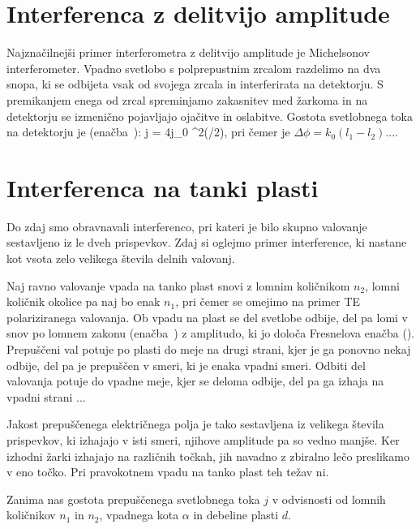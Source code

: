 \section{Interferenca z delitvijo amplitude}
Najznačilnejši primer interferometra z delitvijo amplitude je Michelsonov interferometer.
Vpadno svetlobo s polprepustnim zrcalom razdelimo na dva snopa, ki se odbijeta vsak od 
svojega zrcala in interferirata na detektorju. S premikanjem enega od zrcal spreminjamo
zakasnitev med žarkoma in na detektorju se izmenično pojavljajo ojačitve in oslabitve.
Gostota svetlobnega toka na detektorju je (enačba~):
\beq
j = 4j_0 \cos^2(\Delta \phi/2),
\label{eq:06_24}
\eeq
pri čemer je $\Delta \phi = k_0(l_1-l_2)$....


\section{Interferenca na tanki plasti}
Do zdaj smo obravnavali interferenco, pri kateri je bilo skupno valovanje sestavljeno iz le 
dveh prispevkov. Zdaj si oglejmo primer interference, ki nastane kot vsota zelo velikega 
števila delnih valovanj. 

Naj ravno valovanje vpada na tanko plast snovi z lomnim količnikom $n_2$, lomni količnik 
okolice pa naj bo enak $n_1$, pri čemer se omejimo na primer TE polariziranega valovanja.
Ob vpadu na plast se del svetlobe odbije, del pa lomi v snov po lomnem zakonu (enačba~) 
z amplitudo, ki jo določa Fresnelova enačba (). Prepuščeni val potuje po plasti do meje
na drugi strani, kjer je ga ponovno nekaj odbije, del pa je prepuščen v smeri, ki 
je enaka vpadni smeri. Odbiti del valovanja potuje 
do vpadne meje, kjer se deloma odbije, del pa ga izhaja na vpadni strani ... 

Jakost prepuščenega električnega polja je tako sestavljena iz velikega števila prispevkov, ki 
izhajajo v isti smeri, njihove amplitude pa so vedno manjše. Ker izhodni žarki 
izhajajo na različnih točkah, jih navadno z zbiralno lečo preslikamo v eno točko. Pri pravokotnem
vpadu na tanko plast teh težav ni. 

Zanima nas gostota prepuščenega svetlobnega toka $j$ v odvisnosti od 
lomnih količnikov $n_1$ in $n_2$, vpadnega kota $\alpha$ in debeline plasti $d$. 

